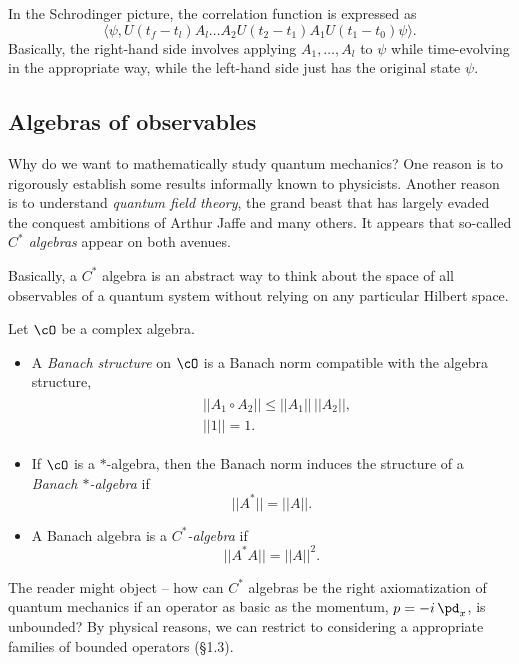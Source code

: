 In the Schrodinger picture, the correlation function is expressed as
\begin{equation*}
    \langle \psi, U(t_f - t_l) A_l \dots A_2 U(t_2 - t_1) A_1 U(t_1 - t_0) \psi\rangle.
\end{equation*}
Basically, the right-hand side involves applying $A_1, \dots, A_l$ to $\psi$ while time-evolving in the appropriate way, while the left-hand side just has the original state $\psi$.


\subsection{Algebras of observables}
Why do we want to mathematically study quantum mechanics? One reason is to rigorously establish some results informally known to physicists. Another reason is to understand \emph{quantum field theory}, the grand beast that has largely evaded the conquest ambitions of Arthur Jaffe and many others. It appears that so-called \emph{$C^*$ algebras} appear on both avenues.

Basically, a $C^*$ algebra is an abstract way to think about the space of all observables of a quantum system without relying on any particular Hilbert space.
\begin{definition}
Let $\cO$ be a complex algebra.
\begin{itemize}
    \item[1.] A \emph{Banach structure} on $\cO$ is a Banach norm compatible with the algebra structure,
    \begin{align*} \begin{split}
        & ||A_1 \circ A_2|| \le ||A_1|| \, ||A_2||,\\
        & ||1|| = 1.
    \end{split} \end{align*}
    \item[2.] If $\cO$ is a $*$-algebra, then the Banach norm induces the structure of a \emph{Banach $*$-algebra} if
    \begin{equation*}
        ||A^*|| = ||A||.
    \end{equation*}
    \item[3.] A Banach algebra is a \emph{$C^*$-algebra} if
    \begin{equation*}
        ||A^* A|| = ||A||^2.
    \end{equation*}
\end{itemize}
\end{definition}
The reader might object -- how can $C^*$ algebras be the right axiomatization of quantum mechanics if an operator as basic as the momentum, $p = -i \, \pd_x$, is unbounded? By physical reasons, we can restrict to considering a appropriate families of bounded operators \cite{strocchi_2005_qm}(\S 1.3).


